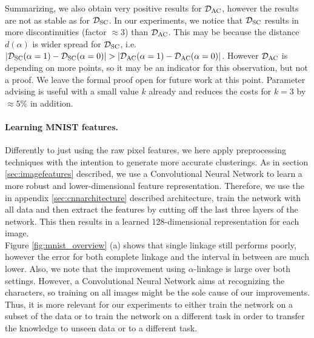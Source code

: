 Summarizing, we also obtain very positive results for $\mathcal{D}_\text{AC}$, however the results are not as stable as for $\mathcal{D}_\text{SC}$. In our experiments, we notice that $\mathcal{D}_\text{SC}$ results in more discontinuities (factor $\approx 3$) than $\mathcal{D}_\text{AC}$. This may be because the distance $d(\alpha)$ is wider spread for $\mathcal{D}_\text{SC}$, i.e. $|\mathcal{D}_\text{SC}(\alpha = 1) - \mathcal{D}_\text{SC}(\alpha = 0)| > |\mathcal{D}_\text{AC}(\alpha = 1) - \mathcal{D}_\text{AC}(\alpha = 0)|$. However $\mathcal{D}_\text{AC}$ is depending on more points, so it may be an indicator for this observation, but not a proof. We leave the formal proof open for future work at this point. Parameter advising is useful with a small value $k$ already and reduces the costs for $k = 3$ by $\approx 5\%$ in addition.

\paragraph{Learning MNIST features.} Differently to just using the raw pixel features, we here apply preprocessing techniques with the intention to generate more accurate clusterings. As in section \ref{sec:imagefeatures} described, we use a Convolutional Neural Network to learn a more robust and lower-dimensional feature representation. Therefore, we use the in appendix \ref{sec:cnnarchitecture} described architecture, train the network with all data and then extract the features by cutting off the last three layers of the network. This then results in a learned 128-dimensional representation for each image.\\

Figure \ref{fig:mnist_overview} (a) shows that single linkage still performs poorly, however the error for both complete linkage and the interval in between are much lower. Also, we note that the improvement using $\alpha$-linkage is large over both settings. However, a Convolutional Neural Network aims at recognizing the characters, so training on all images might be the sole cause of our improvements. Thus, it is more relevant for our experiments to either train the network on a subset of the data or to train the network on a different task in order to transfer the knowledge to unseen data or to a different task.

